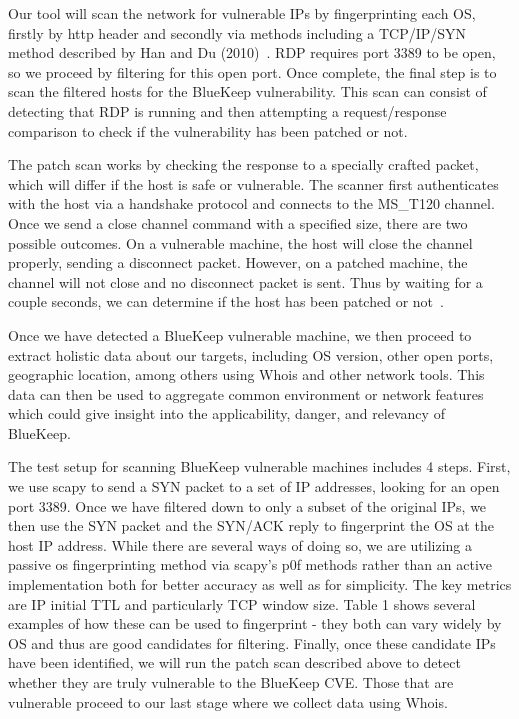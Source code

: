 Our tool will scan the network for vulnerable IPs by fingerprinting each OS, firstly by http header and secondly via methods including a TCP/IP/SYN method described by Han and Du (2010)~\cite{han_du_2010}. RDP requires port 3389 to be open, so we proceed by filtering for this open port. Once complete, the final step is to scan the filtered hosts for the BlueKeep vulnerability. This scan can consist of detecting that RDP is running and then attempting a request/response comparison to check if the vulnerability has been patched or not.

The patch scan works by checking the response to a specially crafted packet, which will differ if the host is safe or vulnerable. The scanner first authenticates with the host via a handshake protocol and connects to the MS\_T120 channel. Once we send a close channel command with a specified size, there are two possible outcomes. On a vulnerable machine, the host will close the channel properly, sending a disconnect packet. However, on a patched machine, the channel will not close and no disconnect packet is sent. Thus by waiting for a couple seconds, we can determine if the host has been patched or not~\cite{dillon_2019}.

Once we have detected a BlueKeep vulnerable machine, we then proceed to extract holistic data about our targets, including OS version, other open ports, geographic location, among others using Whois and other network tools. This data can then be used to aggregate common environment or network features which could give insight into the applicability, danger, and relevancy of BlueKeep.

The test setup for scanning BlueKeep vulnerable machines includes 4 steps. First, we use scapy to send a SYN packet to a set of IP addresses, looking for an open port 3389. Once we have filtered down to only a subset of the original IPs, we then use the SYN packet and the SYN/ACK reply to fingerprint the OS at the host IP address. While there are several ways of doing so, we are utilizing a passive os fingerprinting method via scapy's p0f methods rather than an active implementation both for better accuracy as well as for simplicity. The key metrics are IP initial TTL and particularly TCP window size. Table 1 shows several examples of how these can be used to fingerprint - they both can vary widely by OS and thus are good candidates for filtering. Finally, once these candidate IPs have been identified, we will run the patch scan described above to detect whether they are truly vulnerable to the BlueKeep CVE. Those that are vulnerable proceed to our last stage where we collect data using Whois.